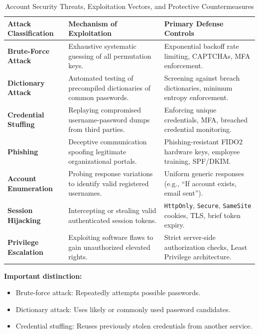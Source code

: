 \begin{table}[htbp]
\centering
\caption{Account Security Threats, Exploitation Vectors, and Protective Countermeasures}
\label{tab:account_security_threats}
\begin{tabularx}{\textwidth}{p{3.5cm} p{4.5cm} X}
\toprule
\textbf{Attack Classification} & \textbf{Mechanism of Exploitation} & \textbf{Primary Defense Controls} \\
\midrule
\textbf{Brute-Force Attack} & Exhaustive systematic guessing of all permutation keys. & Exponential backoff rate limiting, CAPTCHAs, MFA enforcement. \\
\textbf{Dictionary Attack} & Automated testing of precompiled dictionaries of common passwords. & Screening against breach dictionaries, minimum entropy enforcement. \\
\textbf{Credential Stuffing} & Replaying compromised username-password dumps from third parties. & Enforcing unique credentials, MFA, breached credential monitoring. \\
\textbf{Phishing} & Deceptive communication spoofing legitimate organizational portals. & Phishing-resistant FIDO2 hardware keys, employee training, SPF/DKIM. \\
\textbf{Account Enumeration} & Probing response variations to identify valid registered usernames. & Uniform generic responses (e.g., ``If account exists, email sent''). \\
\textbf{Session Hijacking} & Intercepting or stealing valid authenticated session tokens. & \texttt{HttpOnly}, \texttt{Secure}, \texttt{SameSite} cookies, TLS, brief token expiry. \\
\textbf{Privilege Escalation} & Exploiting software flaws to gain unauthorized elevated rights. & Strict server-side authorization checks, Least Privilege architecture. \\
\bottomrule
\end{tabularx}
\end{table}


\textbf{Important distinction:}

\begin{itemize}
\item Brute-force attack: Repeatedly attempts possible passwords.
\item Dictionary attack: Uses likely or commonly used password candidates.
\item Credential stuffing: Reuses previously stolen credentials from another service.
\end{itemize}

